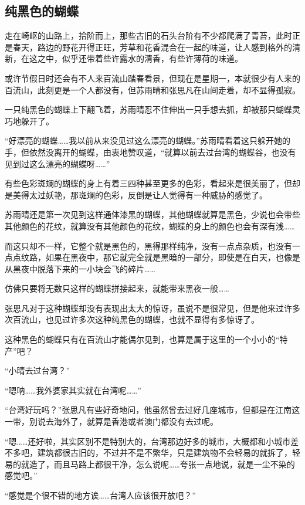 \subsection{纯黑色的蝴蝶}

走在崎岖的山路上，拾阶而上，那些古旧的石头台阶有不少都爬满了青苔，此时正是春天，路边的野花开得正旺，芳草和花香混合在一起的味道，让人感到格外的清新，在这之中，似乎还带着些许露水的清香，有些许薄荷的味道。

或许节假日时还会有不人来百流山踏春看景，但现在是星期一，本就很少有人来的百流山，此刻更是一个人都没有，但苏雨晴和张思凡在山间走着，却不显得孤寂。

一只纯黑色的蝴蝶上下翻飞着，苏雨晴忍不住伸出一只手想去抓，却被那只蝴蝶灵巧地躲开了。

“好漂亮的蝴蝶……我以前从来没见过这么漂亮的蝴蝶。”苏雨晴看着这只躲开她的手，但依然没离开的蝴蝶，由衷地赞叹道，“就算以前去过台湾的蝴蝶谷，也没有见到过这么漂亮的蝴蝶呀……”

有些色彩斑斓的蝴蝶的身上有着三四种甚至更多的色彩，看起来是很美丽了，但却是美得太过妖艳，那斑斓的色彩，反倒是让人觉得有一种威胁的感觉了。

苏雨晴还是第一次见到这样通体漆黑的蝴蝶，其他蝴蝶就算是黑色，少说也会带些其他颜色的花纹，就算没有其他颜色的花纹，蝴蝶的身上的颜色也会有深有浅……

而这只却不一样，它整个就是黑色的，黑得那样纯净，没有一点点杂质，也没有一点点纹路，如果在黑夜中，那它就完全就是黑暗的一部分，即使是在白天，也像是从黑夜中脱落下来的一小块会飞的碎片……

仿佛只要将无数只这样的蝴蝶拼接起来，就能带来黑夜一般……

张思凡对于这种蝴蝶却没有表现出太大的惊讶，虽说不是很常见，但是他来过许多次百流山，也见过许多次这种纯黑色的蝴蝶，也就不显得有多惊讶了。

这种黑色的蝴蝶只有在百流山才能偶尔见到，也算是属于这里的一个小小的“特产”吧？

“小晴去过台湾？”

“嗯呐……我外婆家其实就在台湾呢……”

“台湾好玩吗？”张思凡有些好奇地问，他虽然曾去过好几座城市，但都是在江南这一带，别说去海外了，就算是香港或者澳门都没有去过呢。

“嗯……还好啦，其实区别不是特别大的，台湾那边好多的城市，大概都和小城市差不多吧，建筑都很古旧的，不过并不是不繁华，只是建筑物不会轻易的就拆了，轻易的就造了，而且马路上都很干净，怎么说呢……夸张一点地说，就是一尘不染的感觉吧。”

“感觉是个很不错的地方诶……台湾人应该很开放吧？”

